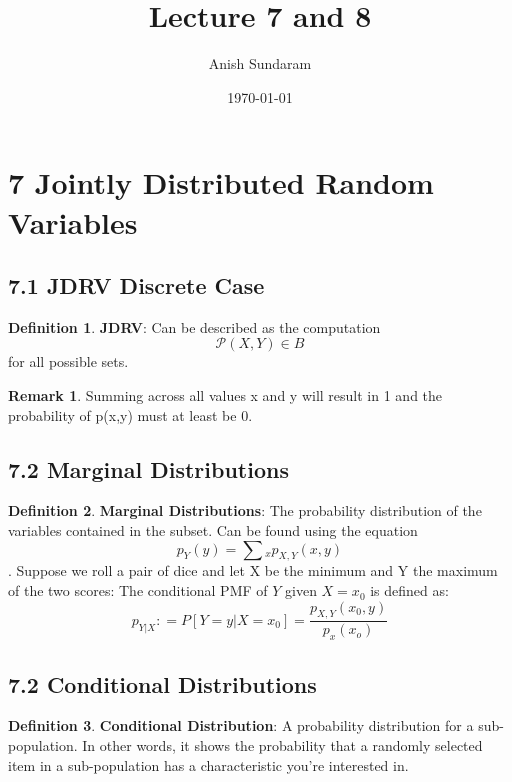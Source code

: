 \documentclass[12pt]{amsart}
\title{Lecture 7 and 8}
\author{Anish Sundaram}
\date{\today}
\theoremstyle{definition}
\newtheorem{definition}{Definition} %
\newtheorem*{remark}{Remark}        %
\numberwithin{equation}{theorem}    %
\begin{document}
\maketitle

\tableofcontents

\section*{7 Jointly Distributed Random Variables}
\subsection*{7.1 JDRV Discrete Case}


\begin{definition}
    \textbf{JDRV}:
    Can be described as the computation $$\mathcal{P}{(X,Y) \in B}$$
    for all possible sets.
    \begin{remark}
        Summing across all values x and y will result in 1 and the probability of p(x,y) must at least be 0.
    \end{remark}
\end{definition}

\subsection{7.2 Marginal Distributions}


\begin{definition}
    \textbf{Marginal Distributions}:
    The probability distribution of the variables contained in the subset. Can be found using the equation $$p_Y(y) = \sum{_x}p_{X,Y}(x,y)$$. Suppose we roll a pair of dice and let X be the minimum and Y the maximum of the two scores:
    The conditional PMF of $Y$ given $X = x_0$ is defined as:
    $$p_{Y|X} : = P[Y=y|X=x_0] = \frac{p_{X,Y}(x_0,y)}{p_x(x_o)}$$

\end{definition}

\subsection*{7.2 Conditional Distributions}

\begin{definition}
    \textbf{Conditional Distribution}:
    A probability distribution for a sub-population. In other words, it shows the probability that a randomly selected item in a sub-population has a characteristic you’re interested in. 

\end{definition}
\end{document}
